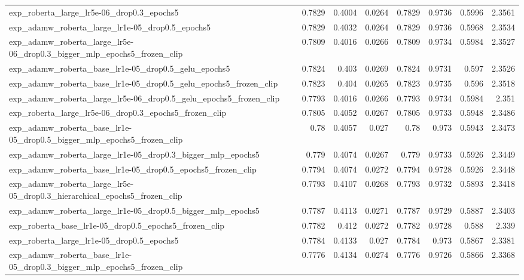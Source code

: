 \documentclass[a4paper,oneside,bibliography=totoc]{scrbook}
\begin{document}
\begin{landscape}
\begin{center}
\begin{longtable}{p{4cm} *{7}{r}}
        exp\_roberta\_large\_lr5e-06\_drop0.3\_epochs5 & 0.7829 & 0.4004 & 0.0264 & 0.7829 & 0.9736 & 0.5996 & 2.3561 \\ 
        exp\_adamw\_roberta\_large\_lr1e-05\_drop0.5\_epochs5 & 0.7829 & 0.4032 & 0.0264 & 0.7829 & 0.9736 & 0.5968 & 2.3534 \\ 
        exp\_adamw\_roberta\_large\_lr5e-06\_drop0.3\_bigger\_mlp\_epochs5\_frozen\_clip & 0.7809 & 0.4016 & 0.0266 & 0.7809 & 0.9734 & 0.5984 & 2.3527 \\ 
        exp\_adamw\_roberta\_base\_lr1e-05\_drop0.5\_gelu\_epochs5 & 0.7824 & 0.403 & 0.0269 & 0.7824 & 0.9731 & 0.597 & 2.3526 \\ 
        exp\_adamw\_roberta\_base\_lr1e-05\_drop0.5\_gelu\_epochs5\_frozen\_clip & 0.7823 & 0.404 & 0.0265 & 0.7823 & 0.9735 & 0.596 & 2.3518 \\ 
        exp\_adamw\_roberta\_large\_lr5e-06\_drop0.5\_gelu\_epochs5\_frozen\_clip & 0.7793 & 0.4016 & 0.0266 & 0.7793 & 0.9734 & 0.5984 & 2.351 \\ 
        exp\_roberta\_large\_lr5e-06\_drop0.3\_epochs5\_frozen\_clip & 0.7805 & 0.4052 & 0.0267 & 0.7805 & 0.9733 & 0.5948 & 2.3486 \\ 
        exp\_adamw\_roberta\_base\_lr1e-05\_drop0.5\_bigger\_mlp\_epochs5\_frozen\_clip & 0.78 & 0.4057 & 0.027 & 0.78 & 0.973 & 0.5943 & 2.3473 \\ 
        exp\_adamw\_roberta\_large\_lr1e-05\_drop0.3\_bigger\_mlp\_epochs5 & 0.779 & 0.4074 & 0.0267 & 0.779 & 0.9733 & 0.5926 & 2.3449 \\ 
        exp\_adamw\_roberta\_base\_lr1e-05\_drop0.5\_epochs5\_frozen\_clip & 0.7794 & 0.4074 & 0.0272 & 0.7794 & 0.9728 & 0.5926 & 2.3448 \\ 
        exp\_adamw\_roberta\_large\_lr5e-05\_drop0.3\_hierarchical\_epochs5\_frozen\_clip & 0.7793 & 0.4107 & 0.0268 & 0.7793 & 0.9732 & 0.5893 & 2.3418 \\ 
        exp\_adamw\_roberta\_large\_lr1e-05\_drop0.5\_bigger\_mlp\_epochs5 & 0.7787 & 0.4113 & 0.0271 & 0.7787 & 0.9729 & 0.5887 & 2.3403 \\ 
        exp\_roberta\_base\_lr1e-05\_drop0.5\_epochs5\_frozen\_clip & 0.7782 & 0.412 & 0.0272 & 0.7782 & 0.9728 & 0.588 & 2.339 \\ 
        exp\_roberta\_large\_lr1e-05\_drop0.5\_epochs5 & 0.7784 & 0.4133 & 0.027 & 0.7784 & 0.973 & 0.5867 & 2.3381 \\ 
        exp\_adamw\_roberta\_base\_lr1e-05\_drop0.3\_bigger\_mlp\_epochs5\_frozen\_clip & 0.7776 & 0.4134 & 0.0274 & 0.7776 & 0.9726 & 0.5866 & 2.3368 \\ 

\end{longtable}
\end{center}
\end{landscape}
\end{document}
